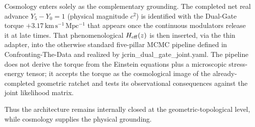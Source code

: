 Cosmology enters solely as the complementary grounding. The completed net real advance \(Y_5-Y_0=1\) (physical magnitude \(c^2\)) is identified with the Dual-Gate torque \(+3.17\,\mathrm{km\,s^{-1}\,Mpc^{-1}}\) that appears once the continuous modulators release it at late times. That phenomenological \(H_{\rm eff}(z)\) is then inserted, via the thin adapter, into the otherwise standard five-pillar MCMC pipeline defined in Confronting-The-Data and realized by jcrin_dual_gate_joint.yaml. The pipeline does not derive the torque from the Einstein equations plus a microscopic stress-energy tensor; it accepts the torque as the cosmological image of the already-completed geometric ratchet and tests its observational consequences against the joint likelihood matrix.

Thus the architecture remains internally closed at the geometric-topological level, while cosmology supplies the physical grounding. 

